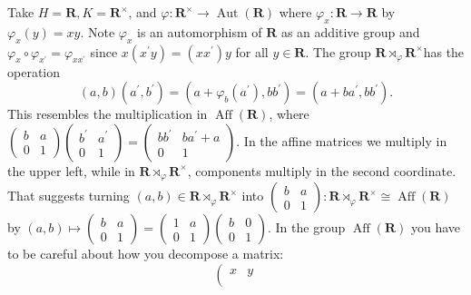 \begin{example}
Take $H=\mathbf{R}, K=\mathbf{R}^{\times}$, and $\varphi: \mathbf{R}^{\times} \rightarrow \operatorname{Aut}(\mathbf{R})$ where $\varphi_x: \mathbf{R} \rightarrow \mathbf{R}$ by $\varphi_x(y)=x y$. Note $\varphi_x$ is an automorphism of $\mathbf{R}$ as an additive group and $\varphi_x \circ \varphi_{x^{\prime}}=\varphi_{x x^{\prime}}$ since $x\left(x^{\prime} y\right)=\left(x x^{\prime}\right) y$ for all $y \in \mathbf{R}$.
The group $\mathbf{R} \rtimes_{\varphi} \mathbf{R}^{\times}$has the operation
\[
(a, b)\left(a^{\prime}, b^{\prime}\right)=\left(a+\varphi_b\left(a^{\prime}\right), b b^{\prime}\right)=\left(a+b a^{\prime}, b b^{\prime}\right) .
\]This resembles the multiplication in $\operatorname{Aff}(\mathbf{R})$, where $\left(\begin{array}{cc}b & a \\ 0 & 1\end{array}\right)\left(\begin{array}{cc}b^{\prime} & a^{\prime} \\ 0 & 1\end{array}\right)=\left(\begin{array}{cc}b b^{\prime} & b a^{\prime}+a \\ 0 & 1\end{array}\right)$. In the affine matrices we multiply in the upper left, while in $\mathbf{R} \rtimes_{\varphi} \mathbf{R}^{\times}$, components multiply in the second coordinate. That suggests turning $(a, b) \in \mathbf{R} \rtimes_{\varphi} \mathbf{R}^{\times}$ into $\left(\begin{array}{ll}b & a \\ 0 & 1\end{array}\right): \mathbf{R} \rtimes_{\varphi} \mathbf{R}^{\times} \cong \operatorname{Aff}(\mathbf{R})$ by $(a, b) \mapsto\left(\begin{array}{ll}b & a \\ 0 & 1\end{array}\right)=\left(\begin{array}{ll}1 & a \\ 0 & 1\end{array}\right)\left(\begin{array}{ll}b & 0 \\ 0 & 1\end{array}\right)$.
In the group $\operatorname{Aff}(\mathbf{R})$ you have to be careful about how you decompose a matrix:
\[
\left(\begin{array}{ll}
x & y \\

\end{array}\]
\end{example}
